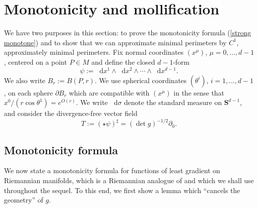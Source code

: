 \documentclass[reqno,12pt,letterpaper]{amsart}
\newcommand{\Sph}{\mathbf S}
\newcommand*\dif{\mathop{}\!\mathrm{d}}
\theoremstyle{definition}
\numberwithin{equation}{section}
\begin{document}
\section{Monotonicity and mollification}\label{MollifierSection}
We have two purposes in this section: to prove the monotonicity formula (\ref{strong monotone}) and to show that we can approximate minimal perimeters by $C^1$, approximately minimal perimeters.
Fix normal coordinates $(x^\mu)$, $\mu = 0, \dots, d - 1$, centered on a point $P \in M$ and define the closed $d-1$-form
\begin{equation}\label{d1 form}
\psi := \dif x^1 \wedge \dif x^2 \wedge \cdots \wedge \dif x^{d - 1}.
\end{equation}
We also write $B_r := B(P, r)$.
We use spherical coordinates $(\theta^i)$, $i = 1, \dots, d - 1$, on each sphere $\partial B_r$ which are compatible with $(x^\mu)$ in the sense that $x^0/(r \cos \theta^1) = e^{O(r)}$.
We write $\dif \sigma$ denote the standard measure on $\Sph^{d - 1}$, and consider the divergence-free vector field
\begin{equation}\label{T in coords}
T := (\star \psi)^\sharp = (\det g)^{-1/2} \partial_0.
\end{equation}

\subsection{Monotonicity formula}
We now state a monotonicity formula for functions of least gradient on Riemannian manifolds, which is a Riemannian analogue of \cite[Proposition 5.12]{Giusti77} and which we shall use throughout the sequel.
To this end, we first show a lemma which ``cancels the geometry'' of $g$.
\end{document}
